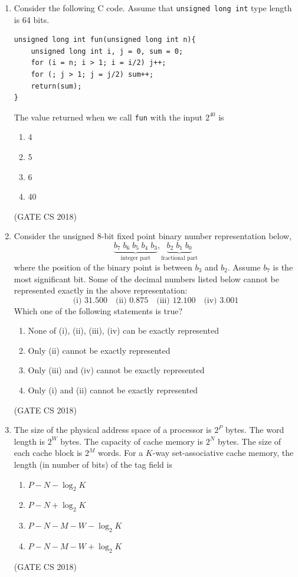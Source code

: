 \documentclass[12pt]{article}
\begin{document}
\begin{enumerate}
\item Consider the following C code. Assume that \texttt{unsigned long int} type length is 64 bits.

\begin{verbatim}
unsigned long int fun(unsigned long int n){
    unsigned long int i, j = 0, sum = 0;
    for (i = n; i > 1; i = i/2) j++;
    for (; j > 1; j = j/2) sum++;
    return(sum);
}
\end{verbatim}

The value returned when we call \texttt{fun} with the input $2^{40}$ is
\begin{multicols}{4}
\begin{enumerate}
\item 4
\item 5
\item 6
\item 40
\end{enumerate}
\end{multicols}
(GATE CS 2018)

\item Consider the unsigned 8-bit fixed point binary number representation below,
$$
\underbrace{b_7\;b_6\;b_5\;b_4\;b_3}_{\text{integer part}},\underbrace{b_2\;b_1\;b_0}_{\text{fractional part}}
$$
where the position of the binary point is between $b_3$ and $b_2$. Assume $b_7$ is the most significant bit. Some of the decimal numbers listed below cannot be represented exactly in the above representation:
$$
\text{(i) }31.500 \quad \text{(ii) }0.875 \quad \text{(iii) }12.100 \quad \text{(iv) }3.001
$$
Which one of the following statements is true?
\begin{enumerate}
\item None of (i), (ii), (iii), (iv) can be exactly represented
\item Only (ii) cannot be exactly represented
\item Only (iii) and (iv) cannot be exactly represented
\item Only (i) and (ii) cannot be exactly represented
\end{enumerate}
(GATE CS 2018)

\item The size of the physical address space of a processor is $2^P$ bytes. The word length is $2^W$ bytes. The capacity of cache memory is $2^N$ bytes. The size of each cache block is $2^M$ words. For a $K$-way set-associative cache memory, the length (in number of bits) of the tag field is
\begin{multicols}{2}
\begin{enumerate}
\item $P - N - \log_2 K$
\item $P - N + \log_2 K$
\item $P - N - M - W - \log_2 K$
\item $P - N - M - W + \log_2 K$
\end{enumerate}
\end{multicols}
(GATE CS 2018)


\end{enumerate}
\end{document}
